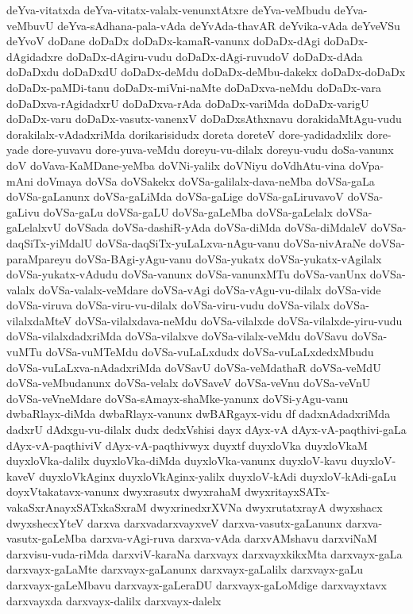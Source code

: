 {deYva-vitatxda
deYva-vitatx-valalx-venunxtAtxre
deYva-veMbudu
deYva-veMbuvU
deYva-sAdhana-pala-vAda
deYvAda-thavAR
deYvika-vAda
deYveVSu
deYvoV
doDane
doDaDx
doDaDx-kamaR-vanunx
doDaDx-dAgi
doDaDx-dAgidadxre
doDaDx-dAgiru-vudu
doDaDx-dAgi-ruvudoV
doDaDx-dAda
doDaDxdu
doDaDxdU
doDaDx-deMdu
doDaDx-deMbu-dakekx
doDaDx-doDaDx
doDaDx-paMDi-tanu
doDaDx-miVni-naMte
doDaDxva-neMdu
doDaDx-vara
doDaDxva-rAgidadxrU
doDaDxva-rAda
doDaDx-variMda
doDaDx-varigU
doDaDx-varu
doDaDx-vasutx-vanenxV
doDaDxsAthxnavu
dorakidaMtAgu-vudu
dorakilalx-vAdadxriMda
dorikarisidudx
doreta
doreteV
dore-yadidadxlilx
dore-yade
dore-yuvavu
dore-yuva-veMdu
doreyu-vu-dilalx
doreyu-vudu
doSa-vanunx
doV
doVava-KaMDane-yeMba
doVNi-yalilx
doVNiyu
doVdhAtu-vina
doVpa-mAni
doVmaya
doVSa
doVSakekx
doVSa-galilalx-dava-neMba
doVSa-gaLa
doVSa-gaLanunx
doVSa-gaLiMda
doVSa-gaLige
doVSa-gaLiruvavoV
doVSa-gaLivu
doVSa-gaLu
doVSa-gaLU
doVSa-gaLeMba
doVSa-gaLelalx
doVSa-gaLelalxvU
doVSada
doVSa-dashiR-yAda
doVSa-diMda
doVSa-diMdaleV
doVSa-daqSiTx-yiMdalU
doVSa-daqSiTx-yuLaLxva-nAgu-vanu
doVSa-nivAraNe
doVSa-paraMpareyu
doVSa-BAgi-yAgu-vanu
doVSa-yukatx
doVSa-yukatx-vAgilalx
doVSa-yukatx-vAdudu
doVSa-vanunx
doVSa-vanunxMTu
doVSa-vanUnx
doVSa-valalx
doVSa-valalx-veMdare
doVSa-vAgi
doVSa-vAgu-vu-dilalx
doVSa-vide
doVSa-viruva
doVSa-viru-vu-dilalx
doVSa-viru-vudu
doVSa-vilalx
doVSa-vilalxdaMteV
doVSa-vilalxdava-neMdu
doVSa-vilalxde
doVSa-vilalxde-yiru-vudu
doVSa-vilalxdadxriMda
doVSa-vilalxve
doVSa-vilalx-veMdu
doVSavu
doVSa-vuMTu
doVSa-vuMTeMdu
doVSa-vuLaLxdudx
doVSa-vuLaLxdedxMbudu
doVSa-vuLaLxva-nAdadxriMda
doVSavU
doVSa-veMdathaR
doVSa-veMdU
doVSa-veMbudanunx
doVSa-velalx
doVSaveV
doVSa-veVnu
doVSa-veVnU
doVSa-veVneMdare
doVSa-sAmayx-shaMke-yanunx
doVSi-yAgu-vanu
dwbaRlayx-diMda
dwbaRlayx-vanunx
dwBARgayx-vidu
df
dadxnAdadxriMda
dadxrU
dAdxgu-vu-dilalx
dudx
dedxVshisi
dayx
dAyx-vA
dAyx-vA-paqthivi-gaLa
dAyx-vA-paqthiviV
dAyx-vA-paqthivwyx
duyxtf
duyxloVka
duyxloVkaM
duyxloVka-dalilx
duyxloVka-diMda
duyxloVka-vanunx
duyxloV-kavu
duyxloV-kaveV
duyxloVkAginx
duyxloVkAginx-yalilx
duyxloV-kAdi
duyxloV-kAdi-gaLu
doyxVtakatavx-vanunx
dwyxrasutx
dwyxrahaM
dwyxritayxSATx-vakaSxrAnayxSATxkaSxraM
dwyxrinedxrXVNa
dwyxrutatxrayA
dwyxshacx
dwyxshecxYteV
darxva
darxvadarxvayxveV
darxva-vasutx-gaLanunx
darxva-vasutx-gaLeMba
darxva-vAgi-ruva
darxva-vAda
darxvAMshavu
darxviNaM
darxvisu-vuda-riMda
darxviV-karaNa
darxvayx
darxvayxkikxMta
darxvayx-gaLa
darxvayx-gaLaMte
darxvayx-gaLanunx
darxvayx-gaLalilx
darxvayx-gaLu
darxvayx-gaLeMbavu
darxvayx-gaLeraDU
darxvayx-gaLoMdige
darxvayxtavx
darxvayxda
darxvayx-dalilx
darxvayx-dalelx
}
